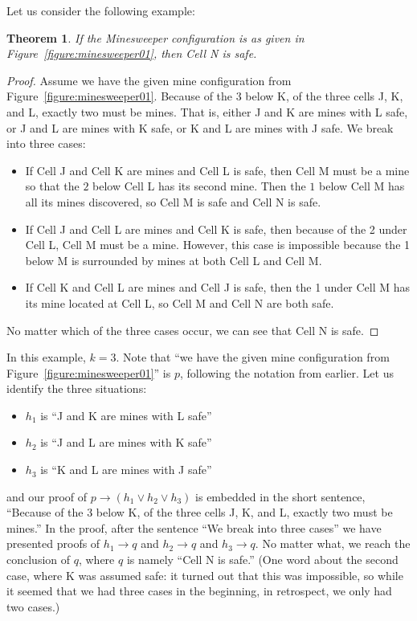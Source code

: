 \documentclass{book}
\newcounter{ekcounter}%
\theoremstyle{ekimcustom}
\newtheorem{theorem}[ekcounter]{Theorem}
\begin{document}
Let us consider the following example:
\begin{theorem}
If the Minesweeper configuration is as given in Figure~\ref{figure:minesweeper01}, then Cell N is safe.
\end{theorem}
\begin{proof}
Assume we have the given mine configuration from Figure~\ref{figure:minesweeper01}.
Because of the 3 below K, of the three cells J, K, and L, exactly two must be mines. That is, either J and K are mines with L safe, or J and L are mines with K safe, or K and L are mines with J safe. We break into three cases:
\begin{itemize}
\item If Cell J and Cell K are mines and Cell L is safe, then Cell M must be a mine so that the $2$ below Cell L has its second mine. Then the $1$ below Cell M has all its mines discovered, so Cell M is safe and Cell N is safe.
\item If Cell J and Cell L are mines and Cell K is safe, then because of the 2 under Cell L, Cell M must be a mine. However, this case is impossible because the 1 below M is surrounded by mines at both Cell L and Cell M.
\item If Cell K and Cell L are mines and Cell J is safe, then the 1 under Cell M has its mine located at Cell L, so Cell M and Cell N are both safe.
\end{itemize}
No matter which of the three cases occur, we can see that Cell N is safe.
\end{proof}
In this example, $k=3$. Note that ``we have the given mine configuration from Figure~\ref{figure:minesweeper01}'' is $p$, following the notation from earlier. Let us identify the three situations:
\begin{itemize}
\item $h_1$ is ``J and K are mines with L safe''
\item $h_2$ is ``J and L are mines with K safe''
\item $h_3$ is ``K and L are mines with J safe''
\end{itemize}
and our proof of $p \rightarrow (h_1 \vee h_2 \vee h_3)$ is embedded in the short sentence, ``Because of the 3 below K, of the three cells J, K, and L, exactly two must be mines.'' In the proof, after the sentence ``We break into three cases'' we have presented proofs of $h_1 \rightarrow q$ and $h_2 \rightarrow q$ and $h_3 \rightarrow q$. No matter what, we reach the conclusion of $q$, where $q$ is namely ``Cell N is safe.'' (One word about the second case, where K was assumed safe: it turned out that this was impossible, so while it seemed that we had three cases in the beginning, in retrospect, we only had two cases.)
\end{document}
